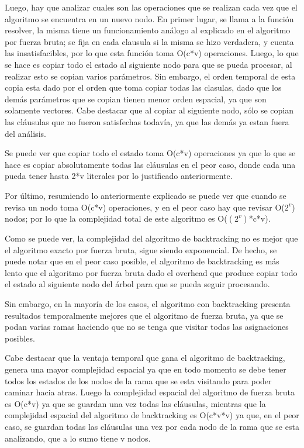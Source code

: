\documentclass[a4paper,10pt]{article}
\begin{document}
Luego, hay que analizar cuales son las operaciones que se realizan cada vez que el algoritmo se encuentra en un nuevo nodo. En primer lugar, se llama a la funci\'on resolver, la misma tiene un funcionamiento an\'alogo al explicado en el algoritmo por fuerza bruta; se fija en cada clausula si la misma se hizo verdadera, y cuenta las insatisfacibles, por lo que esta funci\'on toma O(c*v) operaciones. Luego, lo que se hace es copiar todo el estado al siguiente nodo para que se pueda procesar, al realizar esto se copian varios par\'ametros. Sin embargo, el orden temporal de esta copia esta dado por el orden que toma copiar todas las clasulas, dado que los dem\'as par\'ametros que se copian tienen menor orden espacial, ya que son solamente vectores. Cabe destacar que al copiar al siguiente nodo, s\'olo se copian las cl\'ausulas que no fueron satisfechas todav\'ia, ya que las dem\'as ya estan fuera del an\'alisis.

Se puede ver que copiar todo el estado toma O(c*v) operaciones ya que lo que se hace es copiar absolutamente todas las cl\'ausulas en el peor caso, donde cada una pueda tener hasta 2*v literales por lo justificado anteriormente.

Por \'ultimo, resumiendo lo anteriormente explicado se puede ver que cuando se revisa un nodo toma O(c*v) operaciones, y en el peor caso hay que revisar O($2^{v}$) nodos; por lo que la complejidad total de este algoritmo es O($(2^{v})$*c*v).

Como se puede ver, la complejidad del algoritmo de backtracking no es mejor que el algoritmo exacto por fuerza bruta, sigue siendo exponencial. De hecho, se puede notar que en el peor caso posible, el algoritmo de backtracking es m\'as lento que el algoritmo por fuerza bruta dado el overhead que produce copiar todo el estado al siguiente nodo del \'arbol para que se pueda seguir procesando.

Sin embargo, en la mayor\'ia de los casos, el algoritmo con backtracking presenta resultados temporalmente mejores que el algoritmo de fuerza bruta, ya que se podan varias ramas haciendo que no se tenga que visitar todas las asignaciones posibles.

\medskip

Cabe destacar que la ventaja temporal que gana el algoritmo de backtracking, genera una mayor complejidad espacial ya que en todo momento se debe tener todos los estados de los nodos de la rama que se esta visitando para poder caminar hacia atras. Luego la complejidad espacial del algoritmo de fuerza bruta es O(c*v) ya que se guardan una vez todas las cl\'ausulas, mientras que la complejidad espacial del algoritmo de backtracking es O(c*v*v) ya que, en el peor caso, se guardan todas las cl\'ausulas una vez por cada nodo de la rama que se esta analizando, que a lo sumo tiene v nodos.
\end{document}
